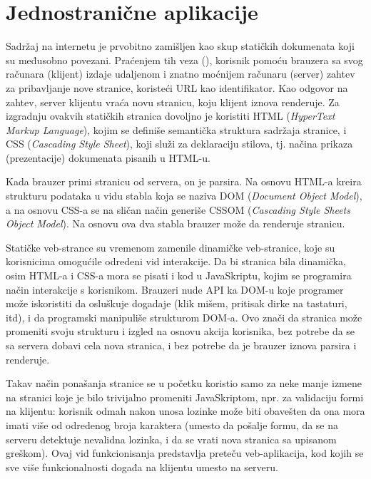 \section{Jednostranične aplikacije}

Sadržaj na internetu je prvobitno zamišljen kao skup statičkih dokumenata koji su međusobno povezani.
Praćenjem tih veza (), korisnik pomoću brauzera sa svog računara (klijent) izdaje udaljenom i znatno moćnijem računaru (server) zahtev za pribavljanje nove stranice, koristeći URL kao identifikator.
Kao odgovor na zahtev, server klijentu vraća novu stranicu, koju klijent iznova renderuje.
Za izgradnju ovakvih statičkih stranica dovoljno je koristiti HTML (\textsl{HyperText Markup Language}), kojim se definiše semantička struktura sadržaja stranice, i CSS (\textsl{Cascading Style Sheet}), koji služi za deklaraciju stilova, tj. načina prikaza (prezentacije) dokumenata pisanih u HTML-u.

Kada brauzer primi stranicu od servera, on je parsira.
Na osnovu HTML-a kreira strukturu podataka u vidu stabla koja se naziva DOM (\textsl{Document Object Model}), a na osnovu CSS-a se na sličan način generiše CSSOM (\textsl{Cascading Style Sheets Object Model}).
Na osnovu ova dva stabla brauzer može da renderuje stranicu.

Statičke veb-strance su vremenom zamenile dinamičke veb-stranice, koje su korisnicima omogućile odredeni vid interakcije.
Da bi stranica bila dinamička, osim HTML-a i CSS-a mora se pisati i kod u JavaSkriptu, kojim se programira način interakcije s korisnikom.
Brauzeri nude API ka DOM-u koje programer može iskoristiti da osluškuje dogadaje (klik mišem, pritisak dirke na tastaturi, itd), i da programski manipuliše strukturom DOM-a.
Ovo znači da stranica može promeniti svoju strukturu i izgled na osnovu akcija korisnika, bez potrebe da se sa servera dobavi cela nova stranica, i bez potrebe da je brauzer iznova parsira i renderuje.

Takav način ponašanja stranice se u početku koristio samo za neke manje izmene na stranici koje je bilo trivijalno promeniti JavaSkriptom, npr. za validaciju formi na klijentu: korisnik odmah nakon unosa lozinke može biti obavešten da ona mora imati više od odredenog broja karaktera (umesto da pošalje formu, da se na serveru detektuje nevalidna lozinka, i da se vrati nova stranica sa upisanom greškom).
Ovaj vid funkcionisanja predstavlja preteču veb-aplikacija, kod kojih se sve više funkcionalnosti događa na klijentu umesto na serveru.

